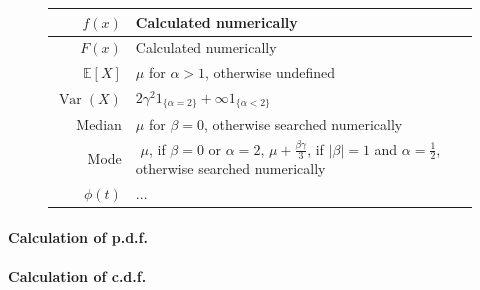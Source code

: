 \documentclass[a4paper,11pt]{article}
\theoremstyle{plain}
\theoremstyle{definition}
\newcommand{\ME}{\mathbb{E}}
\newcommand{\Var}{\operatorname{Var}}
\begin{document}
\begin{figure}[!htb]
\begin{minipage}{0.4\textwidth}
\begin{tabular}{| r | l |}
			\hline
			$f(x)$ & Calculated numerically \\
			\hline
			$F(x)$ & Calculated numerically \\
			\hline
			$\ME[X]$ & \pbox{\linewidth}{$ \mu$ for $\alpha > 1$,\\ otherwise undefined} \\
			\hline
			$\Var(X)$ & $2 \gamma^2 1_{\{ \alpha = 2 \} } + \infty 1_{ \{ \alpha < 2 \} }  $ \\
			\hline
			Median & \pbox{\linewidth}{$\mu$ for $\beta = 0$,\\ otherwise searched numerically} \\
			\hline
			Mode & \pbox{\linewidth}{$ $ \\ $\mu$, if $\beta = 0$ or $\alpha = 2$, \\  $\mu + \frac{\beta \gamma}{3}$, if $|\beta| = 1$ and $\alpha = \frac{1}{2}$, \\ otherwise searched numerically} \\
			\hline
			$\phi(t)$ & $ ...$ \\
			\hline
		\end{tabular}
	    \end{minipage}
	\end{figure}
	
	\paragraph{Calculation of p.d.f.}
	\paragraph{Calculation of c.d.f.}
\end{document}
